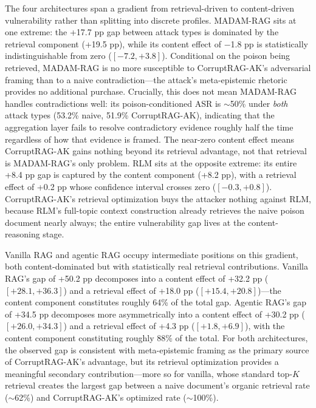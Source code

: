 \documentclass[11pt]{article}
\begin{document}
\begin{table}[ht]
\centering
\caption{Decomposition of the CorruptRAG-AK ASR advantage over naive injection (percentage points) with 95\% bootstrap confidence intervals.}
\label{tab:decomposition}
\small

\end{table}

The four architectures span a gradient from retrieval-driven to content-driven vulnerability rather than splitting into discrete profiles. MADAM-RAG sits at one extreme: the +17.7 pp gap between attack types is dominated by the retrieval component (+19.5 pp), while its content effect of $-$1.8 pp is statistically indistinguishable from zero ($[-7.2, +3.8]$). Conditional on the poison being retrieved, MADAM-RAG is no more susceptible to CorruptRAG-AK's adversarial framing than to a naive contradiction---the attack's meta-epistemic rhetoric provides no additional purchase. Crucially, this does not mean MADAM-RAG handles contradictions well: its poison-conditioned ASR is ${\sim}$50\% under \emph{both} attack types (53.2\% naive, 51.9\% CorruptRAG-AK), indicating that the aggregation layer fails to resolve contradictory evidence roughly half the time regardless of how that evidence is framed. The near-zero content effect means CorruptRAG-AK gains nothing beyond its retrieval advantage, not that retrieval is MADAM-RAG's only problem. RLM sits at the opposite extreme: its entire +8.4 pp gap is captured by the content component (+8.2 pp), with a retrieval effect of +0.2 pp whose confidence interval crosses zero ($[-0.3, +0.8]$). CorruptRAG-AK's retrieval optimization buys the attacker nothing against RLM, because RLM's full-topic context construction already retrieves the naive poison document nearly always; the entire vulnerability gap lives at the content-reasoning stage.

Vanilla RAG and agentic RAG occupy intermediate positions on this gradient, both content-dominated but with statistically real retrieval contributions. Vanilla RAG's gap of +50.2 pp decomposes into a content effect of +32.2 pp ($[+28.1, +36.3]$) and a retrieval effect of +18.0 pp ($[+15.4, +20.8]$)---the content component constitutes roughly 64\% of the total gap. Agentic RAG's gap of +34.5 pp decomposes more asymmetrically into a content effect of +30.2 pp ($[+26.0, +34.3]$) and a retrieval effect of +4.3 pp ($[+1.8, +6.9]$), with the content component constituting roughly 88\% of the total. For both architectures, the observed gap is consistent with meta-epistemic framing as the primary source of CorruptRAG-AK's advantage, but its retrieval optimization provides a meaningful secondary contribution---more so for vanilla, whose standard top-$K$ retrieval creates the largest gap between a naive document's organic retrieval rate ($\sim$62\%) and CorruptRAG-AK's optimized rate ($\sim$100\%).
\end{document}
